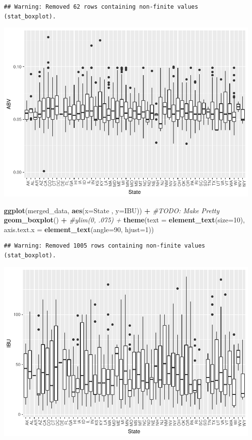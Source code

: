 \documentclass[]{article}
\newenvironment{Shaded}{\begin{snugshade}}{\end{snugshade}}
\newcommand{\KeywordTok}[1]{\textcolor[rgb]{0.13,0.29,0.53}{\textbf{#1}}}
\newcommand{\DataTypeTok}[1]{\textcolor[rgb]{0.13,0.29,0.53}{#1}}
\newcommand{\DecValTok}[1]{\textcolor[rgb]{0.00,0.00,0.81}{#1}}
\newcommand{\StringTok}[1]{\textcolor[rgb]{0.31,0.60,0.02}{#1}}
\newcommand{\CommentTok}[1]{\textcolor[rgb]{0.56,0.35,0.01}{\textit{#1}}}
\newcommand{\OperatorTok}[1]{\textcolor[rgb]{0.81,0.36,0.00}{\textbf{#1}}}
\newcommand{\NormalTok}[1]{#1}
\begin{document}
\begin{verbatim}
## Warning: Removed 62 rows containing non-finite values (stat_boxplot).
\end{verbatim}

\includegraphics{Analysis_Final_files/figure-latex/unnamed-chunk-12-1.pdf}

\begin{Shaded}
\begin{Highlighting}[]
\KeywordTok{ggplot}\NormalTok{(merged_data, }\KeywordTok{aes}\NormalTok{(}\DataTypeTok{x=}\NormalTok{State , }\DataTypeTok{y=}\NormalTok{IBU)) }\OperatorTok{+}\StringTok{  }\CommentTok{#TODO: Make Pretty}
\StringTok{  }\KeywordTok{geom_boxplot}\NormalTok{() }\OperatorTok{+}
\StringTok{  }\CommentTok{#ylim(0, .075) +}
\StringTok{  }\KeywordTok{theme}\NormalTok{(}\DataTypeTok{text =} \KeywordTok{element_text}\NormalTok{(}\DataTypeTok{size=}\DecValTok{10}\NormalTok{),}
        \DataTypeTok{axis.text.x =} \KeywordTok{element_text}\NormalTok{(}\DataTypeTok{angle=}\DecValTok{90}\NormalTok{, }\DataTypeTok{hjust=}\DecValTok{1}\NormalTok{)) }
\end{Highlighting}
\end{Shaded}

\begin{verbatim}
## Warning: Removed 1005 rows containing non-finite values (stat_boxplot).
\end{verbatim}

\includegraphics{Analysis_Final_files/figure-latex/unnamed-chunk-12-2.pdf}
\end{document}
